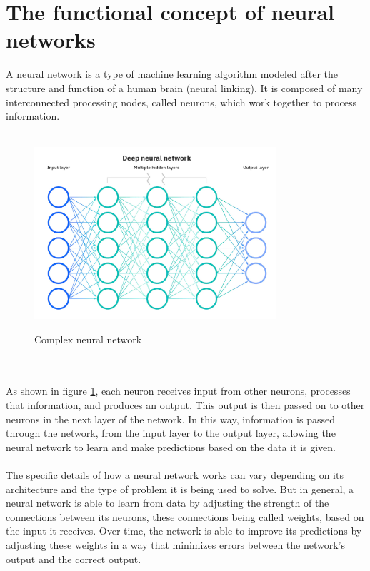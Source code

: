 \section{The functional concept of neural networks}
A neural network is a type of machine learning algorithm modeled 
after the structure and function of a human brain (neural linking). 
It is composed of many interconnected processing nodes, called neurons, 
which work together to process information. 
\\
\\
\begin{figure}[htb]
    \centering
    \includegraphics[width=0.8\textwidth]{pics/neuralnetwork.jpg}
    \caption{Complex neural network}
    \label{fig:neuralnetwork}
    \cite{IBM}
\end{figure}
\\
\\
As shown in figure \ref{fig:neuralnetwork}, each neuron receives input from other neurons, processes that information, 
and produces an output. This output is then passed on to other neurons in the next 
layer of the network. In this way, information is passed through the network, from the 
input layer to the output layer, allowing the neural network to learn and make predictions
based on the data it is given.
\\
\\
The specific details of how a neural network works can vary depending on its architecture
and the type of problem it is being used to solve. But in general, a neural network is able 
to learn from data by adjusting the strength of the connections between its neurons, these 
connections being called weights, based on the input it receives. Over time, the network is 
able to improve its predictions by adjusting these weights in a way that minimizes errors 
between the network's output and the correct output.

